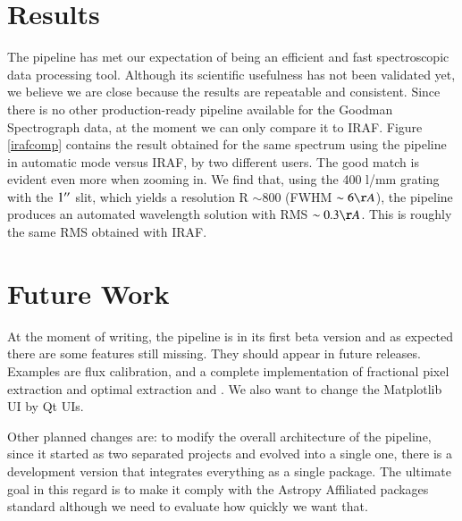 \documentclass[11pt,twoside]{article}
\begin{document}

\section{Results}
The pipeline has met our expectation of being an efficient and fast
spectroscopic data processing tool. Although its scientific usefulness has not
been validated yet, we believe we are close because the results are
repeatable and consistent. Since there is no other production-ready pipeline
available for the Goodman Spectrograph data, at the moment we can only compare it to
IRAF. Figure \ref{irafcomp} contains the result obtained for the same spectrum using
the pipeline in automatic mode versus IRAF, by two different users. The good
match is evident even more when zooming in. 
We find that, using the 400 l/mm grating with the $1\hbox{$^{\prime\prime}$}$ slit, which yields
a resolution R $\sim 800$ (FWHM $\sim 6 \AA$), the pipeline produces an automated 
wavelength solution with RMS $\sim 0.3 \AA$. This is roughly the same RMS obtained
with IRAF.




\section{Future Work}

At the moment of writing, the pipeline is in its first beta version and as
expected there are some features still missing. They should appear in future
releases. Examples are flux calibration, and a complete implementation of fractional pixel
extraction and optimal extraction \citep{1989PASP..101.1032M} and \citep{1986PASP...98..609H}.
We also want to change the Matplotlib UI by Qt UIs.

Other planned changes are: to modify the overall architecture of the pipeline,
since it started as two separated projects and evolved into a single one, there
is a development version that integrates everything as a single package. The 
ultimate goal in this regard is to make it comply with the Astropy Affiliated
packages standard although we need to evaluate how quickly we want that.
\end{document}
